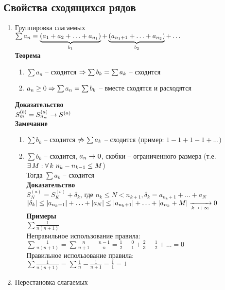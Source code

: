 \documentclass[12pt]{article}
\begin{document}
\subsection{Свойства сходящихся рядов}
\begin{enumerate}
    \item Группировка слагаемых\\
    $\sum a_n = \ub{b_1}{(a_1 + a_2 + \ldots + a_{n_1})} + \ub{b_2}{(a_{n_1+1} + \ldots + a_{n_2})} + \ldots$\\
    \textbf{Теорема}
    \begin{enumerate}
        \item $\sum a_n$ -- сходится $\Rto \sum b_k = \sum a_k$ -- сходится
        \item $a_n \geq 0 \Rto \sum a_n = \sum b_k$ -- вместе сходятся и расходятся
    \end{enumerate}
    \textbf{Доказательство}\\
    $S^{(b)}_m = S^{(a)}_{n_m} \rto S^{(a)}$\\
    \textbf{Замечание}
    \begin{enumerate}
        \item $\sum b_k$ -- сходится $\not\Rto \sum a_k$ -- сходится (пример: $1 - 1 + 1 - 1 + \ldots$)
        \item $\sum b_k$ -- сходится, $a_n \rto 0$, скобки -- ограниченного размера (т.е. $\ex M: \fall k\ n_k - n_{k-1} \leq M$)\\
        Тогда $\sum a_k$ -- сходится\\
        \textbf{Доказательство}\\
        $S_N^{(a)} = S_K^{(b)} + \delta_k$, где $n_k \leq N < n_{k+1}, \delta_k = a_{n_k+1} + \ldots + a_N$\\
        $|\delta_k| \leq |a_{n_k + 1}| + \ldots + |a_N| \leq |a_{n_k + 1}| + \ldots + |a_{n_k} + M| \xrto[k\rto +\infty]{} 0$\\
        \textbf{Примеры}\\
        $\sum \frac1{n(n+1)}$\\
        Неправильное использование правила:\\
        $\sum \frac1{n(n+1)} = \sum \frac n{n+1}-\frac{n-1}n = \frac12 - \frac01 + \frac23 - \frac12 + \ldots = 0$\\
        Правильное использование правила:\\
        $\sum \frac1{n(n+1)} = \sum \frac1{n} - \frac1{n+1} = \frac11 = 1$
    \end{enumerate}
    \item Перестановка слагаемых\\

\end{enumerate}
\end{document}

